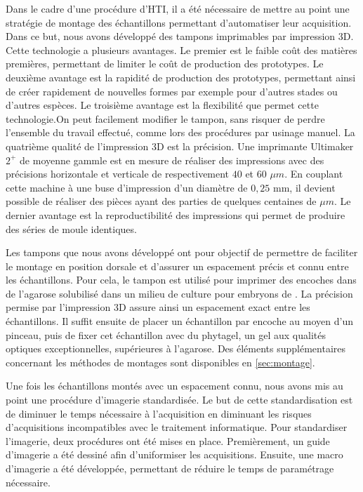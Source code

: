 \documentclass[\main/main.tex]{subfiles}
\begin{document}
%
Dans le cadre d'une procédure d'HTI, il a été nécessaire de mettre au point une stratégie de montage des échantillons permettant d'automatiser leur acquisition.
%
Dans ce but, nous avons développé des tampons imprimables par impression 3D.
%
Cette technologie a plusieurs avantages.
%
Le premier est le faible coût des matières premières, permettant de limiter le coût de production des prototypes.
%
Le deuxième avantage est la rapidité de production des prototypes, permettant ainsi de créer rapidement de nouvelles formes par exemple pour d'autres stades ou d'autres espèces.
%
Le troisième avantage est la flexibilité que permet cette technologie.On peut facilement modifier le tampon, sans risquer de perdre l'ensemble du travail effectué, comme lors des procédures par usinage manuel.
%
La quatrième qualité de l'impression 3D est la précision.
%
Une imprimante Ultimaker $2^+$ de moyenne gammle est en mesure de réaliser des 
impressions avec des précisions horizontale et verticale de respectivement $40$ et $60$ $\mu{}m$.
%
En couplant cette machine à une buse d'impression d'un diamètre de $0,25$ mm, il devient possible de réaliser des pièces ayant des parties de quelques centaines de $\mu{}m$.
%
Le dernier avantage est la reproductibilité  des impressions qui permet de produire des séries de moule identiques.

\label{chapter:bio:montage}
%
Les tampons que nous avons développé ont pour objectif de permettre
de faciliter le montage en position dorsale et d'assurer un espacement
précis et connu entre les échantillons.
%
Pour cela,
le tampon est utilisé pour imprimer des encoches dans de l'agarose solubilisé dans un milieu de culture pour embryons de \pz{}.
%
La précision permise par l'impression 3D assure ainsi un espacement exact entre les échantillons.
%
Il suffit ensuite de placer un échantillon par encoche au moyen d'un pinceau,
puis de fixer cet échantillon avec du phytagel, un gel aux qualités optiques exceptionnelles, supérieures à l'agarose.
%
Des éléments supplémentaires concernant les méthodes de montages sont disponibles en \autoref{sec:montage}.

%
Une fois les échantillons montés avec un espacement connu,
nous avons mis au point une procédure d'imagerie standardisée.
%
Le but de cette standardisation est de diminuer le temps nécessaire à l'acquisition
en diminuant les risques d'acquisitions incompatibles avec le traitement informatique.
%
Pour standardiser l'imagerie, deux procédures ont été mises en place.
%
Premièrement, un guide d'imagerie a été dessiné afin d'uniformiser les acquisitions.
%
Ensuite, une macro d'imagerie a été développée, permettant de réduire le temps
de paramétrage nécessaire.
\end{document}
